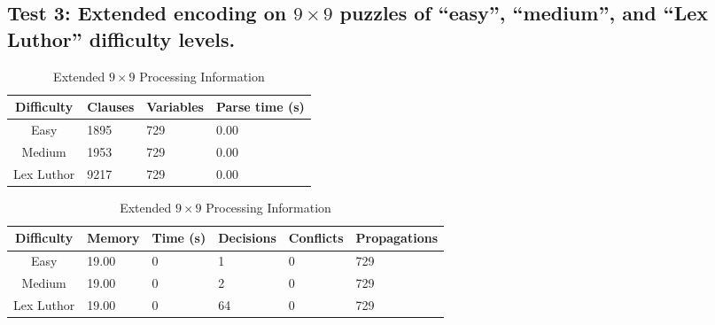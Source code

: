 \documentclass[conference,draftclsnofoot]{IEEEtran}
\begin{document}
\subsection{Test 3: Extended encoding on $9 \times 9$ puzzles of ``easy'', ``medium'',
and ``Lex Luthor'' difficulty levels.}
\FloatBarrier
\begin{table}[htbp]
	\centering
	\begin{tabular}{c | l l l}
		Difficulty & Clauses & Variables & Parse time (s) \\\hline
		Easy 		& 1895 & 729 & 0.00 \\
		Medium 		& 1953 & 729 & 0.00 \\
		Lex Luthor 	& 9217 & 729 & 0.00
	\end{tabular}
	\caption{Extended $9 \times 9$ Parse Information}
	\label{tab:summary}
	\begin{tabular}{c | l l p{20pt} p{20pt} l}
		Difficulty & Memory & Time (s) & Decisions &
		Conflicts & Propagations \\\hline
		Easy 		& 19.00 & 0 	& 1  & 0 & 729\\
		Medium 		& 19.00 & 0 	& 2  & 0 & 729\\
		Lex Luthor 	& 19.00 & 0 	& 64 & 0 & 729
	\end{tabular}
	\caption{Extended $9 \times 9$ Processing Information}
	\label{tab:summary}
\end{table}
\FloatBarrier
% 
\end{document}
